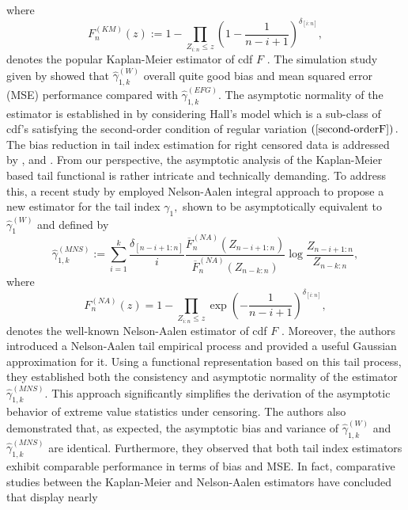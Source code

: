 \documentclass[reqno,openbib,runningheads,a4paper,12pt]{amsart}%
\begin{document}
where%
\[
F_{n}^{\left(  KM\right)  }\left(  z\right)  :=1-\prod_{Z_{i:n}\leq z}\left(
1-\frac{1}{n-i+1}\right)  ^{\delta_{\left[  i:n\right]  }},
\]
denotes the popular Kaplan-Meier estimator of cdf $F$ \citep[] []{KM58}. The
simulation study given by \cite{BMV2018} showed that $\widehat{\gamma}%
_{1,k}^{\left(  W\right)  }$ overall quite good bias and mean squared error
(MSE) performance compared with $\widehat{\gamma}_{1,k}^{\left(  EFG\right)
}.$ The asymptotic normality of the estimator is established in \cite{BWW2019}
by considering Hall's model \citep[] []{Hall82} which is a sub-class of cdf's
satisfying the second-order condition of regular variation $\left(
\ref{second-orderF}\right)  .$ The bias reduction in tail index estimation for
right censored data is addressed by \cite{BBWG2016}, \cite{BMV2018} and
\cite{BWW2019}. From our perspective, the asymptotic analysis of the
Kaplan-Meier based tail functional is rather intricate and technically
demanding. To address this, a recent study by \cite{MNS2025} employed
Nelson-Aalen integral approach to propose a new estimator for the tail index
$\gamma_{1},$ shown to be asymptotically equivalent to $\widehat{\gamma}%
_{1}^{\left(  W\right)  }$ and defined by%
\[
\widehat{\gamma}_{1,k}^{\left(  MNS\right)  }:=\sum_{i=1}^{k}\frac
{\delta_{\left[  n-i+1:n\right]  }}{i}\frac{\overline{F}_{n}^{\left(
NA\right)  }\left(  Z_{n-i+1:n}\right)  }{\overline{F}_{n}^{\left(  NA\right)
}\left(  Z_{n-k:n}\right)  }\log\frac{Z_{n-i+1:n}}{Z_{n-k:n}},
\]
where%
\[
F_{n}^{\left(  NA\right)  }\left(  z\right)  =1-\prod_{Z_{i:n}\leq z}%
\exp\left(  -\frac{1}{n-i+1}\right)  ^{\delta_{\left[  i:n\right]  }},
\]
denotes the well-known Nelson-Aalen estimator of cdf $F$
\citep[] []{Nelson1972}. Moreover, the authors introduced a Nelson-Aalen tail
empirical process and provided a useful Gaussian approximation for it. Using a
functional representation based on this tail process, they established both
the consistency and asymptotic normality of the estimator $\widehat{\gamma
}_{1,k}^{\left(  MNS\right)  }.$ This approach significantly simplifies the
derivation of the asymptotic behavior of extreme value statistics under
censoring. The authors also demonstrated that, as expected, the asymptotic
bias and variance of $\widehat{\gamma}_{1,k}^{\left(  W\right)  }$ and
$\widehat{\gamma}_{1,k}^{\left(  MNS\right)  }$ are identical. Furthermore,
they observed that both tail index estimators exhibit comparable performance
in terms of bias and MSE. In fact, comparative studies between the
Kaplan-Meier and Nelson-Aalen estimators have concluded that display nearly
\end{document}
